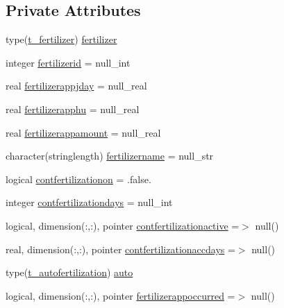 \subsection*{Private Attributes}
\begin{DoxyCompactItemize}
\item 
type(\mbox{\hyperlink{structmodulevegetation_1_1t__fertilizer}{t\+\_\+fertilizer}}) \mbox{\hyperlink{structmodulevegetation_1_1t__fertilizerapps_a08ba2cee1f0f2c7b5f636bc67deda77c}{fertilizer}}
\item 
integer \mbox{\hyperlink{structmodulevegetation_1_1t__fertilizerapps_a580a64e81bc4fe2292f93e6286417862}{fertilizerid}} = null\+\_\+int
\item 
real \mbox{\hyperlink{structmodulevegetation_1_1t__fertilizerapps_a3fff635409101cfc96ce86800b35da65}{fertilizerappjday}} = null\+\_\+real
\item 
real \mbox{\hyperlink{structmodulevegetation_1_1t__fertilizerapps_af3951095a2c84ccd57f164ba8fb51646}{fertilizerapphu}} = null\+\_\+real
\item 
real \mbox{\hyperlink{structmodulevegetation_1_1t__fertilizerapps_a2584abbefa0e7acefc9479e818bccd35}{fertilizerappamount}} = null\+\_\+real
\item 
character(stringlength) \mbox{\hyperlink{structmodulevegetation_1_1t__fertilizerapps_a8cbc2fd900587977a3677f95188a18b1}{fertilizername}} = null\+\_\+str
\item 
logical \mbox{\hyperlink{structmodulevegetation_1_1t__fertilizerapps_a21393d69181f8a6d0c07af43b0096c91}{contfertilizationon}} = .false.
\item 
integer \mbox{\hyperlink{structmodulevegetation_1_1t__fertilizerapps_a977b3bfd64369bc0bc347484ed911301}{contfertilizationdays}} = null\+\_\+int
\item 
logical, dimension(\+:,\+:), pointer \mbox{\hyperlink{structmodulevegetation_1_1t__fertilizerapps_a6f70df95b80702601524cf49f7adc4c5}{contfertilizationactive}} =$>$ null()
\item 
real, dimension(\+:,\+:), pointer \mbox{\hyperlink{structmodulevegetation_1_1t__fertilizerapps_a31224385cf30af47eae5647482ab82fb}{contfertilizationaccdays}} =$>$ null()
\item 
type(\mbox{\hyperlink{structmodulevegetation_1_1t__autofertilization}{t\+\_\+autofertilization}}) \mbox{\hyperlink{structmodulevegetation_1_1t__fertilizerapps_a89df4181b9abaac975cee057635d3882}{auto}}
\item 
logical, dimension(\+:,\+:), pointer \mbox{\hyperlink{structmodulevegetation_1_1t__fertilizerapps_a502bb3cca0c6ff19a757e9c24d462863}{fertilizerappoccurred}} =$>$ null()
\end{DoxyCompactItemize}


